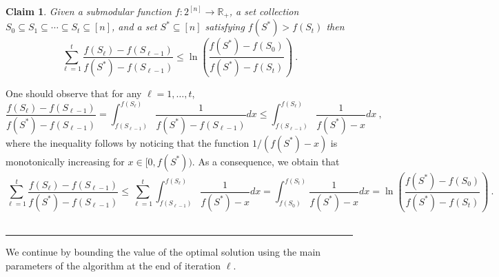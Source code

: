 \documentclass[11pt]{article}
\theoremstyle{plain}
\newtheorem{claim}[theorem]{Claim}
\theoremstyle{definition}
\newcommand{\qedsymb}{\hfill{\rule{2mm}{2mm}}}
\renewenvironment{proof}{\begin{trivlist} \item[\hspace{\labelsep}{\bf \noindent Proof.\/}] }{\qedsymb\end{trivlist}}\newenvironment{proofof}[1]{\begin{trivlist} \item[\hspace{\labelsep}{\bf \noindent Proof of #1.\/}] }{\qedsymb\end{trivlist}}\newenvironment{MyEqn}[1]{\setlength\arraycolsep{2pt}\begin{eqnarray*} #1}{\end{eqnarray*}}
\newcommand{\bbR}{\mathbb{R}}
\begin{document}
\begin{claim} \label{claim:SubmodularBound}
Given a submodular function $f: 2^{[n]} \to \bbR_+$, a set
collection $S_0 \subseteq S_1 \subseteq \cdots \subseteq S_t
\subseteq [n]$, and a set $S^* \subseteq [n]$ satisfying $f(S^*) >
f(S_t)$ then
$$
\sum_{\ell = 1}^{t} \frac{f(S_{\ell}) - f(S_{\ell - 1})}{f(S^*) -
f(S_{\ell - 1})} \leq \ln\left(\frac{f(S^*) - f(S_0)}{f(S^*) -
f(S_t)} \right) \ .
$$
\end{claim}
\begin{proof}
One should observe that for any $\ell = 1, \ldots, t$,
$$
\frac{f(S_{\ell}) - f(S_{\ell - 1})}{f(S^*) - f(S_{\ell - 1})} =
\int_{f(S_{\ell - 1})}^{f(S_{\ell})} \frac{1}{f(S^*) - f(S_{\ell -
1})}dx \leq \int_{f(S_{\ell - 1})}^{f(S_{\ell})} \frac{1}{f(S^*) -
x}dx \ ,
$$
where the inequality follows by noticing that the function $1 /
(f(S^*) - x)$ is monotonically increasing for $x \in [0, f(S^*))$.
As a consequence, we obtain that
$$
\sum_{\ell = 1}^{t} \frac{f(S_{\ell}) - f(S_{\ell - 1})}{f(S^*) -
f(S_{\ell - 1})} \leq \sum_{\ell = 1}^{t} \int_{f(S_{\ell -
1})}^{f(S_{\ell})} \frac{1}{f(S^*) - x}dx = \int_{f(S_0)}^{f(S_t)}
\frac{1}{f(S^*) - x}dx =
\ln\left(\frac{f(S^*)-f(S_0)}{f(S^*)-f(S_t)}\right) \ .
$$~
\end{proof}

We continue by bounding the value of the optimal solution using
the main parameters of the algorithm at the end of iteration
$\ell$.
\end{document}
